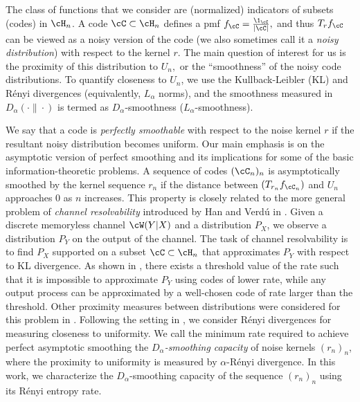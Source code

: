 \documentclass{amsart}
\theoremstyle{remark}
\begin{document}
The class of functions that we consider are (normalized) indicators of subsets (codes) in $\cH_n$. A code $\cC\subset \cH_n$ defines a pmf 
$f_{\cC}=\frac{\1_{\cC}}{|\cC|},$ and thus $T_rf_{\cC}$ can be viewed as a noisy version of the code (we also sometimes call it a 
\emph{noisy distribution}) with respect to the kernel $r$. The main question of interest for us is the proximity of this distribution to $U_n,$ or the ``smoothness'' of the noisy code distributions. To quantify closeness to $U_n$, we use the Kullback-Leibler (KL) and  R{\'e}nyi divergences (equivalently, $L_{\alpha}$ norms), and the smoothness measured in $D_{\alpha}(\cdot\|\cdot)$ is termed as $D_{\alpha}$-smoothness ($L_{\alpha}$-smoothness).

We say that a code is {\em perfectly smoothable} with respect to the noise kernel $r$ if the resultant noisy distribution becomes uniform.
Our main emphasis is on the asymptotic version of perfect smoothing and its implications for some of the 
basic information-theoretic problems. A sequence of codes $(\cC_n)_n$ is asymptotically smoothed by the 
kernel sequence $r_n$ if the distance between $(T_{r_n}f_{\cC_n})$ and $U_n$ approaches 0 as $n$ 
increases. This property is closely related to the more general problem of {\em channel resolvability} 
introduced by Han and Verd{\'u} in \cite{han1993approximation}. Given a discrete memoryless channel 
$\cW(Y|X)$ and a distribution $P_X$, we observe a distribution $P_Y$ on the output of the channel. The 
task of channel resolvability is to find $P_X$ supported on a subset $\cC\subset \cH_n$ that approximates 
$P_Y$ with respect to KL divergence. As shown in \cite{han1993approximation}, there exists a threshold 
value of the rate such that it is impossible to approximate $P_Y$ using codes of lower rate, 
while any output process can be approximated by a well-chosen code of rate larger than the threshold.
Other proximity measures between distributions were considered for this problem in \cite{steinberg1996simulation,liu2016e_,yu2018renyi}. %
Following the setting in \cite{yu2018renyi}, we consider R{\'e}nyi divergences for measuring closeness to uniformity. We call the minimum rate required to achieve perfect asymptotic smoothing the \emph{ $D_{\alpha}$-smoothing capacity} of noise kernels $(r_n)_n$, where the proximity to uniformity is measured by $\alpha$-R{\'e}nyi divergence. In this work, we characterize the $D_{\alpha}$-smoothing capacity of the sequence $(r_n)_n$ using its R{\'e}nyi entropy rate.
\end{document}
